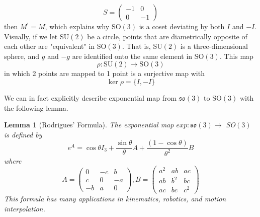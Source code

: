 \documentclass{article}
\newtheorem{lemma}[theorem]{Lemma}
\theoremstyle{remark}
\theoremstyle{definition}
\begin{document}
\[S  = \begin{pmatrix}
-1&0\\0&-1
\end{pmatrix}\]
then $M^\prime = M$, which explains why SO$(3)$ is a coset deviating by both $I$ and $-I$. Visually, if we let SU$(2)$ be a circle, points that are diametrically opposite of each other are "equivalent" in SO$(3)$. That is, SU$(2)$ is a three-dimensional sphere, and $g$ and $-g$ are identified onto the same element in SO$(3)$. This map
\[\rho: \text{SU}(2) \longrightarrow \text{SO}(3)\]
in which 2 points are mapped to 1 point is a surjective map with
\[\ker{\rho} = \{I, -I\}\]
\begin{center}
\end{center}

We can in fact explicitly describe exponential map from $\mathfrak{so}(3)$ to SO$(3)$ with the following lemma. 

\begin{lemma}[Rodrigues' Formula]
The exponential map $exp: \mathfrak{so}(3) \longrightarrow$ SO$(3)$ is defined by 
\[e^A = \cos{\theta} I_3 + \frac{\sin{\theta}}{\theta} A + \frac{(1 - \cos{\theta})}{\theta^2} B\]
where 
\[A = \begin{pmatrix}
0&-c&b\\c&0&-a\\-b&a&0
\end{pmatrix}, B = \begin{pmatrix}
a^2&ab&ac\\ab&b^2&bc\\ac&bc&c^2
\end{pmatrix}\]
This formula has many applications in kinematics, robotics, and motion interpolation. 
\end{lemma}
\end{document}
